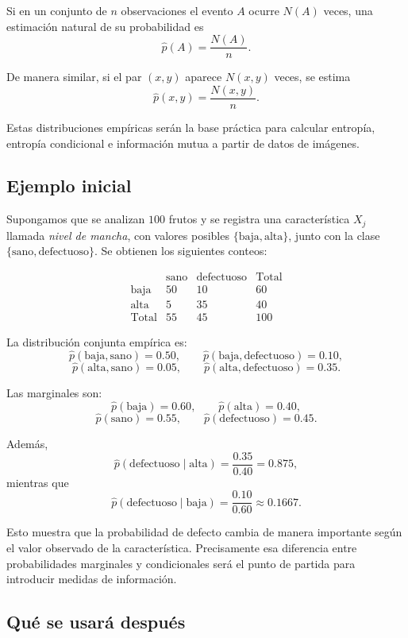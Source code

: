 \documentclass{article}
\begin{document}
Si en un conjunto de \(n\) observaciones el evento \(A\) ocurre \(N(A)\) veces, una estimación natural de su probabilidad es
\[
\widehat{p}(A)=\frac{N(A)}{n}.
\]

De manera similar, si el par \((x,y)\) aparece \(N(x,y)\) veces, se estima
\[
\widehat{p}(x,y)=\frac{N(x,y)}{n}.
\]

Estas distribuciones empíricas serán la base práctica para calcular entropía, entropía condicional e información mutua a partir de datos de imágenes.

\subsection{Ejemplo inicial}

Supongamos que se analizan \(100\) frutos y se registra una característica \(X_j\) llamada \textit{nivel de mancha}, con valores posibles \(\{\text{baja},\text{alta}\}\), junto con la clase \(\{\text{sano},\text{defectuoso}\}\). Se obtienen los siguientes conteos:

\[
\begin{array}{c|cc|c}
 & \text{sano} & \text{defectuoso} & \text{Total} \\
\hline
\text{baja} & 50 & 10 & 60 \\
\text{alta} & 5 & 35 & 40 \\
\hline
\text{Total} & 55 & 45 & 100
\end{array}
\]

La distribución conjunta empírica es:
\[
\widehat{p}(\text{baja},\text{sano})=0.50,\qquad
\widehat{p}(\text{baja},\text{defectuoso})=0.10,
\]
\[
\widehat{p}(\text{alta},\text{sano})=0.05,\qquad
\widehat{p}(\text{alta},\text{defectuoso})=0.35.
\]

Las marginales son:
\[
\widehat{p}(\text{baja})=0.60,\qquad
\widehat{p}(\text{alta})=0.40,
\]
\[
\widehat{p}(\text{sano})=0.55,\qquad
\widehat{p}(\text{defectuoso})=0.45.
\]

Además,
\[
\widehat{p}(\text{defectuoso}\mid \text{alta})=\frac{0.35}{0.40}=0.875,
\]
mientras que
\[
\widehat{p}(\text{defectuoso}\mid \text{baja})=\frac{0.10}{0.60}\approx 0.1667.
\]

Esto muestra que la probabilidad de defecto cambia de manera importante según el valor observado de la característica. Precisamente esa diferencia entre probabilidades marginales y condicionales será el punto de partida para introducir medidas de información.

\subsection{Qué se usará después}
\end{document}
